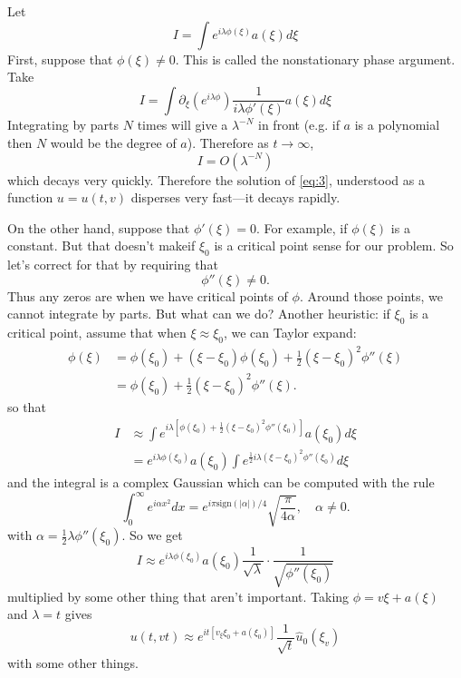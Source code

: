\documentclass{article}
\begin{document}
Let
\begin{equation*}
  I = \int e^{i\lambda\phi(\xi)}a(\xi)d\xi 
\end{equation*}
First, suppose that $\phi(\xi) \neq 0$. This is called the nonstationary phase
argument. Take
\begin{equation*}
  I 
  = \int \partial_{\xi} \left( e^{i\lambda \phi} \right)\frac{1}{i\lambda \phi'(\xi)} a(\xi)d\xi  
\end{equation*}
Integrating by parts $N$ times will give a $\lambda^{-N}$ in front (e.g. if $a$
is a polynomial then $N$ would be the degree of $a$). Therefore as
$t\to \infty$,
\begin{equation*}
  I = O(\lambda^{-N})
\end{equation*}
which decays very quickly. Therefore the solution of \cref{eq:3}, understood as
a function $u=u(t,v)$ disperses very fast---it decays rapidly.

On the other hand, suppose that $\phi'(\xi) = 0$. For example, if $\phi(\xi)$ is
a constant. But that doesn't makeif $\xi_{0}$ is a critical point sense for our
problem. So let's correct for that by requiring that
\begin{equation*}
  \phi''(\xi) \neq 0.
\end{equation*}
Thus any zeros are when we have critical points of $\phi$. Around those points,
we cannot integrate by parts. But what can we do? Another heuristic: if
$\xi_{0}$ is a critical point, assume that when $\xi\approx \xi_{0}$, we can
Taylor expand:
\begin{align*}
  \phi(\xi) 
  &= \phi(\xi_{0}) + (\xi-\xi_{0})\phi(\xi_{0}) + \frac{1}{2}(\xi-\xi_{0})^{2}\phi''(\xi) \\
  &= \phi(\xi_{0}) + \frac{1}{2}(\xi-\xi_{0})^{2}\phi''(\xi).
\end{align*}
so that
\begin{align*}
  I 
  &\approx \int e^{i\lambda \left[ \phi(\xi_{0})+\frac{1}{2}(\xi-\xi_{0})^{2}\phi''(\xi_{0}) \right] } a(\xi_{0})d\xi \\
  &= e^{i\lambda \phi(\xi_{0})}a(\xi_{0}) \int e^{\frac{1}{2}i\lambda (\xi-\xi_{0})^{2}\phi''(\xi_{0})}d\xi
\end{align*}
and the integral is a complex Gaussian which can be computed with the rule
\begin{equation*}
  \int_{0}^{\infty}e^{i\alpha x^{2}}dx 
  = e^{i\pi \text{sign}(|\alpha|)/4} \sqrt{\frac{\pi}{4\alpha}}
  , \quad \alpha  \neq 0.
\end{equation*}
with $\alpha = \frac{1}{2}\lambda \phi''(\xi_{0})$. So we get
\begin{equation*}
  I 
  \approx e^{i \lambda \phi(\xi_{0})} a(\xi_{0}) \frac{1}{\sqrt{\lambda}} \cdot \frac{1}{\sqrt{\phi''(\xi_{0})}}
\end{equation*}
multiplied by some other thing that aren't important. Taking $\phi = v\xi +
a(\xi)$  and $\lambda= t$ gives
\begin{equation*}
  u(t,vt) 
  \approx e^{it \left[ v_{\xi}\xi_{0}+ a(\xi_{0}) \right] }\frac{1}{\sqrt{t}}\hat{u}_{0}(\xi_{v})
\end{equation*}
with some other things.
\end{document}
